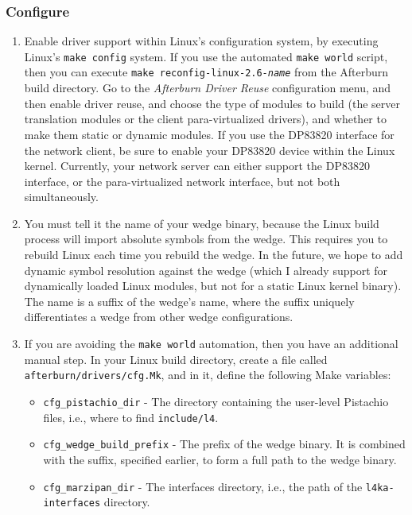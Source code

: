 \documentclass[10pt,a4paper]{article}
\newcommand{\code}[1]{\texttt{#1}}
\newcommand{\cmd}[1]{\texttt{#1}}
\newcommand{\dir}[1]{\texttt{#1}}
\begin{document}
\subsubsection{Configure}
\begin{enumerate}
\item Enable driver support within Linux's configuration system, by
executing Linux's \cmd{make config} system.  If you use the automated
\cmd{make world} script, then you can execute \cmd{make
reconfig-linux-2.6-\emph{name}} from the Afterburn build directory.
Go to the \emph{Afterburn Driver Reuse} configuration menu, and then
enable driver reuse, and choose the type of modules to
build (the server translation modules or the client para-virtualized
drivers), and whether to make them static or dynamic
modules.  If you use the DP83820 interface for the network client, be sure to
enable your DP83820 device within the Linux kernel.  Currently, your
network server can either support the DP83820 interface, or the
para-virtualized network interface, but not both simultaneously.
\item You must tell it the name of your wedge binary, because the
Linux build process will import absolute symbols from the wedge.  This
requires you to rebuild Linux each time you rebuild the wedge.  In the
future, we hope to add dynamic symbol resolution against the wedge
(which I already support for dynamically loaded Linux modules, but not
for a static Linux kernel binary).  The name is a suffix of the
wedge's name, where the suffix uniquely differentiates a wedge from
other wedge configurations.
\item If you are avoiding the \cmd{make world} automation, then you
have an additional manual step.  In your Linux build directory,
create a file called \dir{afterburn/drivers/cfg.Mk}, and in it,
define the following Make
variables: \begin{itemize}
\item \code{cfg\_pistachio\_dir} - The directory containing the
user-level Pistachio files, i.e., where to find \dir{include/l4}.
\item \code{cfg\_wedge\_build\_prefix} - The prefix of the wedge
binary.  It is combined with the suffix, specified earlier, to form a
full path to the wedge binary.
\item \code{cfg\_marzipan\_dir} - The interfaces directory, i.e., the
path of the \dir{l4ka-interfaces} directory.
\end{itemize}

\end{enumerate}
\end{document}
